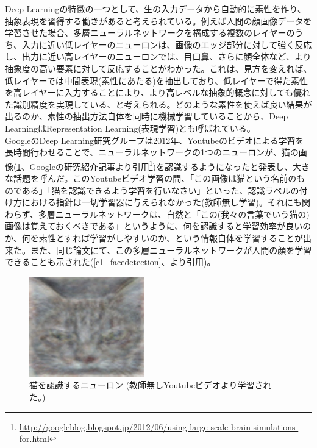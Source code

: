 Deep Learningの特徴の一つとして、生の入力データから自動的に素性を作り、抽象表現を習得する働きがあると考えられている。例えば人間の顔画像データを学習させた場合、多層ニューラルネットワークを構成する複数のレイヤーのうち、入力に近い低レイヤーのニューロンは、画像のエッジ部分に対して強く反応し、出力に近い高レイヤーのニューロンでは、目口鼻、さらに顔全体など、より抽象度の高い要素に対して反応することがわかった。これは、見方を変えれば、低レイヤーでは中間表現(素性にあたる)を抽出しており、低レイヤーで得た素性を高レイヤーに入力することにより、より高レベルな抽象的概念に対しても優れた識別精度を実現している、と考えられる。どのような素性を使えば良い結果が出るのか、素性の抽出方法自体を同時に機械学習していることから、Deep LearningはRepresentation Learning(表現学習)とも呼ばれている。\\
GoogleのDeep Learning研究グループは2012年、Youtubeのビデオによる学習を長時間行わせることで、ニューラルネットワークの1つのニューロンが、猫の画像(\ref{c1_catdetection}、Googleの研究紹介記事より引用\footnote{\url{http://googleblog.blogspot.jp/2012/06/using-large-scale-brain-simulations-for.html}})を認識するようになったと発表し、大きな話題を呼んだ\cite{le2012building}。このYoutubeビデオ学習の間、「この画像は猫という名前のものである」「猫を認識できるよう学習を行いなさい」といった、認識ラベルの付け方における指針は一切学習器に与えられなかった(教師無し学習)。それにも関わらず、多層ニューラルネットワークは、自然と「この(我々の言葉でいう猫の)画像は覚えておくべきである」というように、何を認識すると学習効率が良いのか、何を素性とすれば学習がしやすいのか、という情報自体を学習することが出来た。また、同じ論文にて、この多層ニューラルネットワークが人間の顔を学習できることも示された(\ref{c1_facedetection}、\cite{le2012building}より引用)。\\
\begin{figure}[tbp]
 \begin{center}
  \includegraphics[width=50mm]{img/c1/cat_detection}
 \end{center}
 \caption{猫を認識するニューロン (教師無しYoutubeビデオより学習された。)}
 \label{c1_catdetection}
\end{figure}
